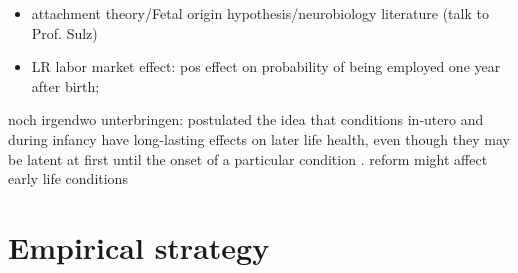 \documentclass[11pt, a4paper,draft]{article} %
\begin{document}










\begin{itemize}
	\item attachment theory/Fetal origin hypothesis/neurobiology literature (talk to Prof. Sulz)

	\item LR labor market effect: pos effect on probability of being employed one year after birth; \cite{albagli2018}
\end{itemize} 
noch irgendwo unterbringen: 
\cite{Barker1990origins} postulated the idea that conditions in-utero and during infancy have long-lasting effects on later life health, even though they may be latent at first until the onset of a particular condition \citep{almond2011fetalorigins}. reform might affect early life conditions 


\newpage
\section{Empirical strategy}\label{sec:empirical_strategy}
\end{document}
